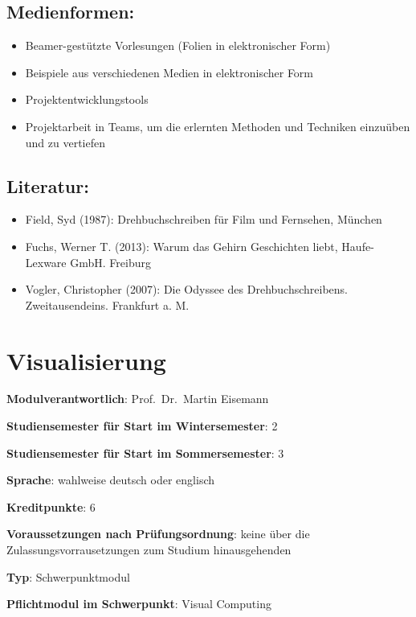 \section*{Medienformen:}\label{medienformen-17}

\begin{itemize}
\tightlist
\item
  Beamer-gestützte Vorlesungen (Folien in elektronischer Form)
\item
  Beispiele aus verschiedenen Medien in elektronischer Form
\item
  Projektentwicklungstools
\item
  Projektarbeit in Teams, um die erlernten Methoden und Techniken
  einzuüben und zu vertiefen
\end{itemize}

\section*{Literatur:}\label{literatur-17}

\begin{itemize}
\tightlist
\item
  Field, Syd (1987): Drehbuchschreiben für Film und Fernsehen, München
\item
  Fuchs, Werner T. (2013): Warum das Gehirn Geschichten liebt,
  Haufe-Lexware GmbH. Freiburg
\item
  Vogler, Christopher (2007): Die Odyssee des Drehbuchschreibens.
  Zweitausendeins. Frankfurt a. M.
\end{itemize}

\chapter{Visualisierung}\label{visualisierung}

\begin{modulHead}
\textbf{Modulverantwortlich}: Prof.~Dr.~Martin
Eisemann
\end{modulHead}
\begin{modulHead}
\textbf{Studiensemester für
Start im Wintersemester}:
2
\end{modulHead}
\begin{modulHead}
\textbf{Studiensemester für Start
im Sommersemester}:
3
\end{modulHead}
\begin{modulHead}
\textbf{Sprache}: wahlweise deutsch
oder englisch
\end{modulHead}
\begin{modulHead}
\textbf{Kreditpunkte}:
6
\end{modulHead}
\begin{modulHead}
\textbf{Voraussetzungen nach
Prüfungsordnung}: keine über die Zulassungsvorrausetzungen zum Studium
hinausgehenden
\end{modulHead}
\begin{modulHead}
\textbf{Typ}:
Schwerpunktmodul
\end{modulHead}
\begin{modulHead}
\textbf{Pflichtmodul
im Schwerpunkt}: Visual Computing
\end{modulHead}


